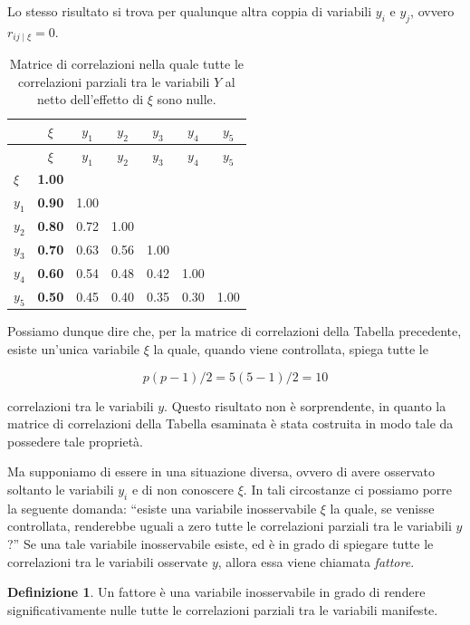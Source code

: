 \documentclass[
  11pt,
]{krantz}
\theoremstyle{definition}
\newtheorem{definition}{Definizione}[chapter]
\theoremstyle{definition}
\theoremstyle{definition}
\theoremstyle{definition}
\theoremstyle{remark}
\begin{document}
Lo stesso risultato si trova per qualunque altra coppia di variabili \(y_i\) e \(y_j\), ovvero \(r_{ij \mid \xi} = 0\).

\hypertarget{tab:corr-parziale}{}
\begin{longtable}[]{@{}lcccccc@{}}
\caption{Matrice di correlazioni nella quale tutte le correlazioni parziali tra le variabili \(Y\) al netto dell'effetto di \(\xi\) sono nulle.}\tabularnewline
\toprule
& \(\xi\) & \(y_1\) & \(y_2\) & \(y_3\) & \(y_4\) & \(y_5\) \\
\midrule
\endfirsthead
\toprule
& \(\xi\) & \(y_1\) & \(y_2\) & \(y_3\) & \(y_4\) & \(y_5\) \\
\midrule
\endhead
\(\xi\) & \textbf{1.00} & & & & & \\
\(y_1\) & \textbf{0.90} & 1.00 & & & & \\
\(y_2\) & \textbf{0.80} & 0.72 & 1.00 & & & \\
\(y_3\) & \textbf{0.70} & 0.63 & 0.56 & 1.00 & & \\
\(y_4\) & \textbf{0.60} & 0.54 & 0.48 & 0.42 & 1.00 & \\
\(y_5\) & \textbf{0.50} & 0.45 & 0.40 & 0.35 & 0.30 & 1.00 \\
\bottomrule
\end{longtable}

Possiamo dunque dire che, per la matrice di correlazioni della Tabella precedente, esiste un'unica variabile \(\xi\) la quale, quando viene controllata, spiega tutte le

\[
p(p-1)/2 = 5(5-1)/2=10
\]

correlazioni tra le variabili \(y\). Questo risultato non è sorprendente, in quanto la matrice di correlazioni della Tabella esaminata è stata costruita in modo tale da possedere tale proprietà.

Ma supponiamo di essere in una situazione diversa, ovvero di avere osservato soltanto le variabili \(y_i\) e di non conoscere \(\xi\). In tali circostanze ci possiamo porre la seguente domanda: ``esiste una variabile inosservabile \(\xi\) la quale, se venisse controllata, renderebbe uguali a zero tutte le correlazioni parziali tra le variabili \(y\)?'' Se una tale variabile inosservabile esiste, ed è in grado di spiegare tutte le correlazioni tra le variabili osservate \(y\), allora essa viene chiamata \emph{fattore}.

\begin{definition}
Un fattore è una variabile inosservabile in grado di rendere significativamente nulle tutte le correlazioni parziali tra le variabili manifeste.
\end{definition}
\end{document}
